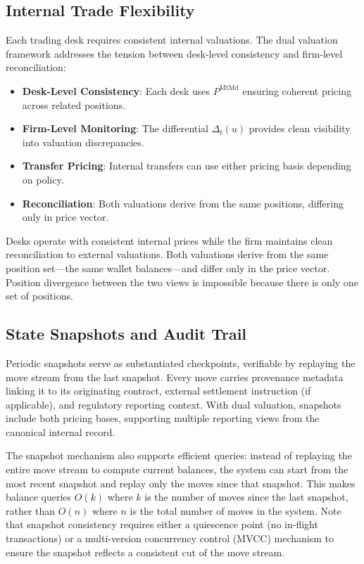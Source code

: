 \documentclass[11pt,a4paper]{article}
\begin{document}
\subsection{Internal Trade Flexibility}

Each trading desk requires consistent internal valuations. The dual valuation framework addresses the tension between desk-level consistency and firm-level reconciliation:

\begin{itemize}
\item \textbf{Desk-Level Consistency}: Each desk uses $P^{\text{MtMd}}$ ensuring coherent pricing across related positions.
\item \textbf{Firm-Level Monitoring}: The differential $\Delta_t(u)$ provides clean visibility into valuation discrepancies.
\item \textbf{Transfer Pricing}: Internal transfers can use either pricing basis depending on policy.
\item \textbf{Reconciliation}: Both valuations derive from the same positions, differing only in price vector.
\end{itemize}

Desks operate with consistent internal prices while the firm maintains clean reconciliation to external valuations. Both valuations derive from the same position set---the same wallet balances---and differ only in the price vector. Position divergence between the two views is impossible because there is only one set of positions.

\subsection{State Snapshots and Audit Trail}

Periodic snapshots serve as substantiated checkpoints, verifiable by replaying the move stream from the last snapshot. Every move carries provenance metadata linking it to its originating contract, external settlement instruction (if applicable), and regulatory reporting context. With dual valuation, snapshots include both pricing bases, supporting multiple reporting views from the canonical internal record.

The snapshot mechanism also supports efficient queries: instead of replaying the entire move stream to compute current balances, the system can start from the most recent snapshot and replay only the moves since that snapshot. This makes balance queries $O(k)$ where $k$ is the number of moves since the last snapshot, rather than $O(n)$ where $n$ is the total number of moves in the system. Note that snapshot consistency requires either a quiescence point (no in-flight transactions) or a multi-version concurrency control (MVCC) mechanism to ensure the snapshot reflects a consistent cut of the move stream.
\end{document}
